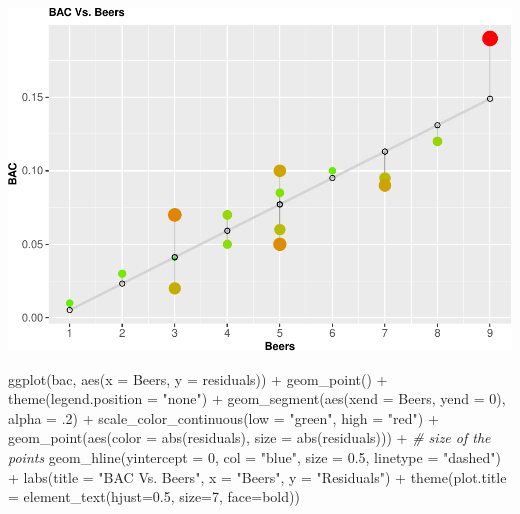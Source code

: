 \documentclass[
]{book}
\newenvironment{Shaded}{\begin{snugshade}}{\end{snugshade}}
\newcommand{\AttributeTok}[1]{\textcolor[rgb]{0.77,0.63,0.00}{#1}}
\newcommand{\CommentTok}[1]{\textcolor[rgb]{0.56,0.35,0.01}{\textit{#1}}}
\newcommand{\DecValTok}[1]{\textcolor[rgb]{0.00,0.00,0.81}{#1}}
\newcommand{\FloatTok}[1]{\textcolor[rgb]{0.00,0.00,0.81}{#1}}
\newcommand{\FunctionTok}[1]{\textcolor[rgb]{0.00,0.00,0.00}{#1}}
\newcommand{\NormalTok}[1]{#1}
\newcommand{\SpecialCharTok}[1]{\textcolor[rgb]{0.00,0.00,0.00}{#1}}
\newcommand{\StringTok}[1]{\textcolor[rgb]{0.31,0.60,0.02}{#1}}
\begin{document}
\includegraphics[width=1\linewidth]{Cool_R_codes_files/figure-latex/unnamed-chunk-1-1}

\begin{Shaded}
\begin{Highlighting}[]
\FunctionTok{ggplot}\NormalTok{(bac, }\FunctionTok{aes}\NormalTok{(}\AttributeTok{x =}\NormalTok{ Beers, }\AttributeTok{y =}\NormalTok{ residuals)) }\SpecialCharTok{+}
  \FunctionTok{geom\_point}\NormalTok{() }\SpecialCharTok{+}
  \FunctionTok{theme}\NormalTok{(}\AttributeTok{legend.position =} \StringTok{"none"}\NormalTok{) }\SpecialCharTok{+}
  \FunctionTok{geom\_segment}\NormalTok{(}\FunctionTok{aes}\NormalTok{(}\AttributeTok{xend =}\NormalTok{ Beers, }\AttributeTok{yend =} \DecValTok{0}\NormalTok{), }\AttributeTok{alpha =}\NormalTok{ .}\DecValTok{2}\NormalTok{) }\SpecialCharTok{+}
  \FunctionTok{scale\_color\_continuous}\NormalTok{(}\AttributeTok{low =} \StringTok{"green"}\NormalTok{, }\AttributeTok{high =} \StringTok{"red"}\NormalTok{) }\SpecialCharTok{+}   
  \FunctionTok{geom\_point}\NormalTok{(}\FunctionTok{aes}\NormalTok{(}\AttributeTok{color =} \FunctionTok{abs}\NormalTok{(residuals), }\AttributeTok{size =} \FunctionTok{abs}\NormalTok{(residuals))) }\SpecialCharTok{+}  \CommentTok{\# size of the points}
  \FunctionTok{geom\_hline}\NormalTok{(}\AttributeTok{yintercept =} \DecValTok{0}\NormalTok{, }\AttributeTok{col =} \StringTok{"blue"}\NormalTok{, }\AttributeTok{size =} \FloatTok{0.5}\NormalTok{, }\AttributeTok{linetype =} \StringTok{"dashed"}\NormalTok{) }\SpecialCharTok{+} 
  \FunctionTok{labs}\NormalTok{(}\AttributeTok{title =} \StringTok{"BAC Vs. Beers"}\NormalTok{,}
       \AttributeTok{x =} \StringTok{"Beers"}\NormalTok{,}
       \AttributeTok{y =} \StringTok{"Residuals"}\NormalTok{) }\SpecialCharTok{+}
  \FunctionTok{theme}\NormalTok{(}\AttributeTok{plot.title =} \FunctionTok{element\_text}\NormalTok{(}\AttributeTok{hjust=}\FloatTok{0.5}\NormalTok{, }\AttributeTok{size=}\DecValTok{7}\NormalTok{, }\AttributeTok{face=}\StringTok{\textquotesingle{}bold\textquotesingle{}}\NormalTok{)) }
\end{Highlighting}
\end{Shaded}
\end{document}
